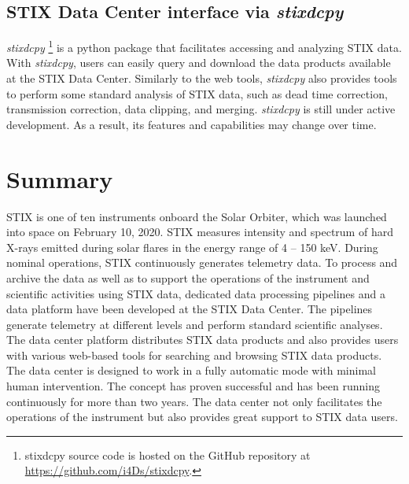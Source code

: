 \documentclass[referee]{aa} %
\begin{document}
\subsection{STIX Data Center interface via  {\it stixdcpy}}
{\it stixdcpy} \footnote{stixdcpy source code is hosted on the GitHub repository at \url{https://github.com/i4Ds/stixdcpy}.} is a python package that facilitates accessing and analyzing STIX data. 
With {\it stixdcpy}, users can easily query and download the data products available at the STIX Data Center.
Similarly to the web tools, {\it stixdcpy} also provides tools to perform some standard analysis of STIX data, such as dead time correction, transmission correction, data clipping, and merging. 
{\it stixdcpy} is still under active development. 
As a result, its features and 
capabilities may change over time.  

\section{Summary}
\label{sec:summary}
STIX is one of ten instruments onboard the Solar Orbiter, 
which was launched into space on February 10, 2020.
 STIX measures  
intensity and spectrum of hard X-rays emitted during solar flares
in the energy range of 4 -- 150 keV.  
 During nominal operations, STIX continuously generates telemetry data. 
 To process and archive the data as well as to support the operations of the
 instrument and scientific activities using STIX data, 
 dedicated data processing pipelines and a data platform have been 
 developed at the STIX Data Center.
 The pipelines generate telemetry at different levels and perform standard scientific analyses.  The data center platform distributes STIX data products and also provides users 
 with various web-based tools for searching and browsing STIX data products. 
  The data center is designed to work in a 
 fully automatic mode with minimal human intervention. The concept has proven successful 
 and has been running continuously for more than two years.
The data center not only facilitates the operations of the instrument but also provides great support to STIX data users.





\end{document}
